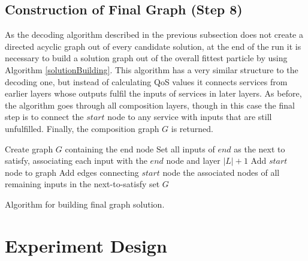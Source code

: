 \documentclass{llncs}
\begin{document}
\subsection{Construction of Final Graph (Step 8)}

As the decoding algorithm described in the previous subsection does not create a directed acyclic graph out of every candidate solution, at the end of the run it is necessary to build a solution graph out of the overall fittest particle by using Algorithm \ref{solutionBuilding}. This algorithm has a very similar structure to the decoding one, but instead of calculating QoS values it connects services from earlier layers whose outputs fulfil the inputs of services in later layers. As before, the algorithm goes through all composition layers, though in this case the final step is to connect the $start$ node to any service with inputs that are still unfulfilled. Finally, the composition graph $G$ is returned.

\begin{algorithm}[!htb]
\setlength{}
 \LinesNumbered
 \SetNlSty{}{}{:}
 Create graph $G$ containing the end node\;
 Set all inputs of $end$ as the next to satisfy, associating each input with the $end$ node and layer $|L|+1$\;
 Add $start$ node to graph\;
 Add edges connecting $start$ node the associated nodes of all remaining inputs in the next-to-satisfy set\;
 \Return $G$\;
\caption{Algorithm for building final graph solution.}
\label{solutionBuilding}
\end{algorithm}

\section{Experiment Design}\label{experiment_design}
\end{document}
